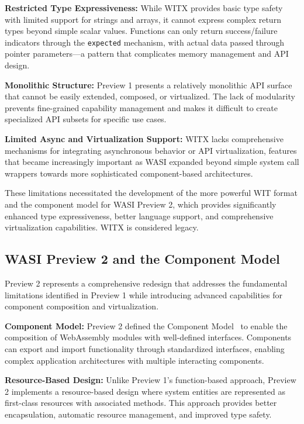 \textbf{Restricted Type Expressiveness:} While WITX provides basic type safety with limited support for strings and arrays, it cannot express complex return types beyond simple scalar values. Functions can only return success/failure indicators through the \texttt{expected} mechanism, with actual data passed through pointer parameters—a pattern that complicates memory management and API design.

\textbf{Monolithic Structure:} Preview 1 presents a relatively monolithic API surface that cannot be easily extended, composed, or virtualized. The lack of modularity prevents fine-grained capability management and makes it difficult to create specialized API subsets for specific use cases.

\textbf{Limited Async and Virtualization Support:} WITX lacks comprehensive mechanisms for integrating asynchronous behavior or API virtualization, features that became increasingly important as WASI expanded beyond simple system call wrappers towards more sophisticated component-based architectures.

These limitations necessitated the development of the more powerful WIT format and the component model for WASI Preview 2, which provides significantly enhanced type expressiveness, better language support, and comprehensive virtualization capabilities. WITX is considered legacy.

\subsection{WASI Preview 2 and the Component Model}
\label{subsec:wasi-preview2}

Preview 2 represents a comprehensive redesign that addresses the fundamental limitations identified in Preview 1 while introducing advanced capabilities for component composition and virtualization.

\textbf{Component Model:} Preview 2 defined the Component Model~\cite{wasi_component_model} to enable the composition of WebAssembly modules with well-defined interfaces. Components can export and import functionality through standardized interfaces, enabling complex application architectures with multiple interacting components.

\textbf{Resource-Based Design:} Unlike Preview 1's function-based approach, Preview 2 implements a resource-based design where system entities are represented as first-class resources with associated methods. This approach provides better encapsulation, automatic resource management, and improved type safety.


